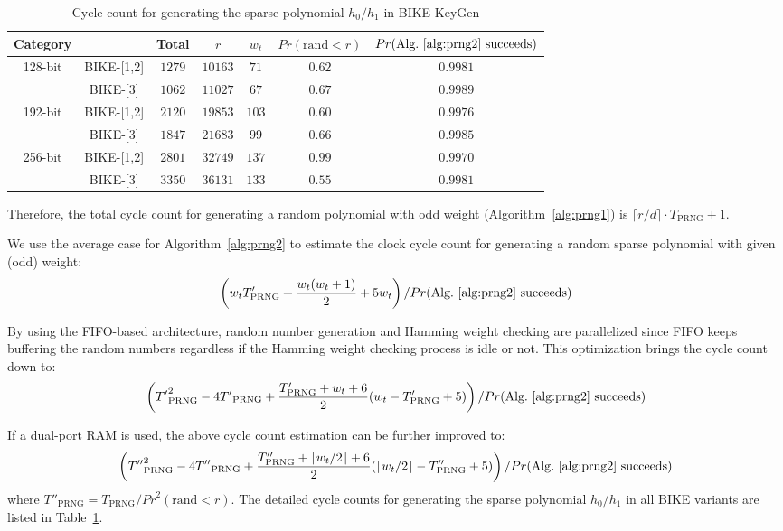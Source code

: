 \documentclass[runningheads]{llncs}
\begin{document}
\begin{table}[!tb]\centering
\caption{Cycle count for generating the sparse polynomial $h_0/h_1$ in BIKE KeyGen}\label{table:spare_ploy_gen}
\begin{tabular}{cc|ccccc}
  \hline
 \textbf{Category}        &             & Total & $r$  & $w_t$  & $Pr(\text{rand} < r)$& $Pr(\text{Alg.~\ref{alg:prng2} succeeds})$\\\hline
\multirow{ 2}{*}{128-bit} &  BIKE-[1,2] & $1279$ & $10163$  & $71$  & $0.62$ & $0.9981$\\
                          &  BIKE-[3] & $1062$ & $11027$  & $67$  & $0.67$& $0.9989$\\
  \hline
\multirow{ 2}{*}{192-bit} &  BIKE-[1,2] & $2120$ & $19853$  & $103$  &$0.60$& $0.9976$\\
                          &  BIKE-[3] & $1847$ & $21683$  & $99$  &$0.66$& $0.9985$\\
  \hline
\multirow{ 2}{*}{256-bit} &  BIKE-[1,2] & $2801$ & $32749$  & $137$  &$0.99$& $0.9970$\\
                          &  BIKE-[3] & $3350$ & $36131$  & $133$  &$0.55$& $0.9981$\\
  \hline
\end{tabular}
\vspace{-4mm}
\end{table}

Therefore, the total cycle count for generating a random polynomial with odd weight (Algorithm~\ref{alg:prng1}) is
$\lceil r/d\rceil\cdot T_{\text{PRNG}} + 1$.


We use the average case for Algorithm~\ref{alg:prng2} to estimate the clock cycle count for generating a random sparse polynomial with given (odd) weight:
\[
   \left(w_tT'_{\text{PRNG}} + \frac{w_t(w_t+1)}{2} + 5w_t\right)/Pr(\text{Alg.~\ref{alg:prng2} succeeds})
\]

By using the FIFO-based architecture, random number generation and
Hamming weight checking are parallelized since FIFO keeps buffering
the random numbers regardless if the Hamming weight checking
process is idle or not. This optimization brings the cycle count down to:
\[
    \left({T'}_{\text{PRNG}}^2 - 4{T'}_{\text{PRNG}} + \frac{T'_{\text{PRNG}}+w_t+6}{2}(w_t-T'_{\text{PRNG}}+5)\right)/Pr(\text{Alg.~\ref{alg:prng2} succeeds})
\]

If a dual-port RAM is used, the above cycle count estimation can be further improved to:
\[
    \left({T''}_{\text{PRNG}}^2 - 4{T''}_{\text{PRNG}} + \frac{T''_{\text{PRNG}}+\lceil w_t/2\rceil+6}{2}(\lceil w_t/2\rceil-T''_{\text{PRNG}}+5)\right)/Pr(\text{Alg.~\ref{alg:prng2} succeeds})
\]
where ${T''}_{\text{PRNG}}=T_{\text{PRNG}}/{Pr}^2(\text{rand} < r)$. The detailed cycle counts for generating the sparse polynomial $h_0/h_1$ in all BIKE variants are listed in Table~\ref{table:spare_ploy_gen}.
\end{document}

